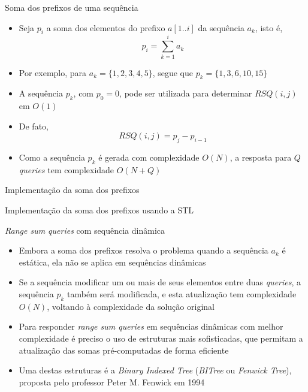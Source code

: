 \begin{frame}[fragile]{Soma dos prefixos de uma sequência}

    \begin{itemize}
        \item Seja $p_i$ a soma dos elementos do prefixo $a[1..i]$ da sequência $a_k$, isto é,
        \[
            p_i = \sum_{k = 1}^i a_k
        \]

        \item Por exemplo, para $a_k = \lbrace 1, 2, 3, 4, 5\rbrace$, segue que
            $p_k = \lbrace 1, 3, 6, 10, 15\rbrace$

        \item A sequência $p_k$, com $p_0 = 0$, pode ser utilizada para determinar $RSQ(i, j)$
            em $O(1)$

        \item De fato,
        \[
            RSQ(i, j) = p_j - p_{i - 1}
        \]

        \item Como a sequência $p_k$ é gerada com complexidade $O(N)$, a resposta para $Q$ 
            \textit{queries} tem complexidade $O(N + Q)$
    \end{itemize}

\end{frame}

\begin{frame}[fragile]{Implementação da soma dos prefixos}
\end{frame}

\begin{frame}[fragile]{Implementação da soma dos prefixos usando a STL}
\end{frame}


\begin{frame}[fragile]{{\it Range sum queries} com sequência dinâmica}

    \begin{itemize}
        \item Embora a soma dos prefixos resolva o problema quando a sequência $a_k$ é 
            estática, ela não se aplica em sequências dinâmicas

        \item Se a sequência modificar um ou mais de seus elementos entre duas \textit{queries},
            a sequência $p_k$ também será modificada, e esta atualização tem complexidade $O(N)$,
            voltando à complexidade da solução original

        \item Para responder \textit{range sum queries} em sequências dinâmicas com melhor
            complexidade
            é preciso o uso de estruturas mais sofisticadas, que permitam a atualização das
            somas pré-computadas de forma eficiente

        \item Uma destas estruturas é a \textit{Binary Indexed Tree} (\textit{BITree} ou 
            \textit{Fenwick Tree}), proposta pelo professor Peter M. Fenwick em 1994
    \end{itemize}

\end{frame}
